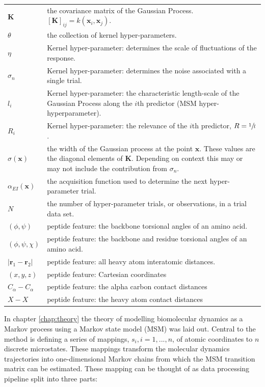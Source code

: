 \begin{table}
\begin{tabularx}{0.9\textwidth}{ |l| >{\raggedright\arraybackslash}X | }
        $\mathbf{K}$ & the covariance matrix of the Gaussian Process. $[\mathbf{K}]_{ij} =k(\mathbf{x}_{i}, \mathbf{x}_{j})$. \\
        $\theta$ & the collection of kernel hyper-parameters. \\
        $\eta$ & Kernel hyper-parameter: determines the scale of fluctuations of the response. \\
        $\sigma_{n}$ & Kernel hyper-parameter: determines the noise associated with a single trial. \\
        $l_{i}$ & Kernel hyper-parameter: the characteristic length-scale of the Gaussian Process 
                along the $i$th predictor (MSM hyper-hyperparameter).\\
        $R_{i}$ & Kernel hyper-parameter: the relevance of the $i$th predictor, $R=\sfrac{1}{l}$. \\ 
        $\sigma(\mathbf{x})$ & the width of the Gaussian process at the point $\mathbf{x}$. These values  are the diagonal elements of $\mathbf{K}$. Depending on context this may or may not include the contribution from $\sigma_{n}$. \\
        $\alpha_{EI}(\mathbf{x})$ & the acquisition function used to determine the next hyper-parameter trial. \\
        $N$ & the number of hyper-parameter trials, or observations,  in a trial data set.\\
        $(\phi, \psi)$ & peptide feature: the backbone torsional angles of an amino acid.  \\
        $(\phi, \psi, \chi)$ & peptide feature: the backbone and residue torsional angles of an amino acid. \\
        $|\mathbf{r}_{1}-\mathbf{r}_{2}|$ & peptide feature: all heavy atom interatomic distances.  \\
        $(x, y, z)$ & peptide feature: Cartesian coordinates \\
        $C_{\alpha}-C_{\alpha}$ & peptide feature: the alpha carbon contact distances \\
        $X-X$ & peptide feature: the heavy atom contact distances \\
    \hline
     \end{tabularx}
    \label{tab:my_label}
\end{table}

In chapter \ref{chap:theory} the theory of modelling biomolecular dynamics as a Markov process using a Markov state model (MSM) was laid out. Central to the method is defining  a series of mappings, $s_i, i=1, ..., n$, of atomic coordinates to $n$ discrete microstates. These mappings transform the molecular dynamics trajectories into one-dimensional Markov chains from which the MSM transition matrix can be estimated. These mapping can be thought of as data processing pipeline split into three parts: 

